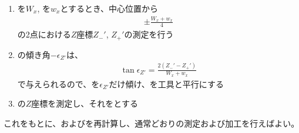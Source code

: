 \begin{enumerate}[label=\sarrow]
\item \ACOD を$W_x$, \TopEndACID を$w_x$とするとき、中心位置から
\begin{align*}
  \pm\frac{W_x+w_x}4
\end{align*}
の2点における$Z$座標$Z_-'$, $Z_+'$の測定を行う
\item \TopEndFace の傾き角$-\epsilon_{Z'}$は、
\begin{align*}
  \tan\epsilon_{Z'} = \frac{2(Z_-'-Z_+')}{W_x+w_x}
\end{align*}
で与えられるので、\Table を$\epsilon_{Z'}$だけ傾け、\TopEndFace を工具と平行にする
\item \TopEndFace の$Z$座標を測定し、それを\TopAlocationLength とする
\end{enumerate}
これをもとに、\AlocationAngle および\DimpleAngle を再計算し、通常どおり\Dimple の測定および加工を行えばよい。


